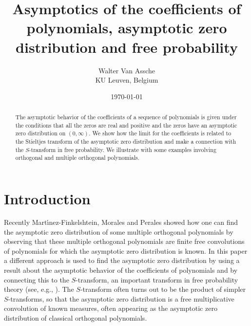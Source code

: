 \documentclass[12pt]{article}
\title{Asymptotics of the coefficients of polynomials,  asymptotic zero distribution and free probability}
\author{Walter Van Assche \\ KU Leuven, Belgium}
\date{\today}
\numberwithin{equation}{section}
\begin{document}
  \maketitle

\begin{abstract}
The asymptotic behavior of the coefficients of a sequence of polynomials is given under the conditions that all the zeros are real and positive and the zeros
have an asymptotic zero distribution on $(0,\infty)$. We show how the limit for the coefficients is related to the Stieltjes transform of the asymptotic zero distribution and make a connection with the  $S$-transform in free probability. We illustrate with some examples involving orthogonal and multiple orthogonal polynomials.
\end{abstract}

\section{Introduction}
Recently Mart\'\i nez-Finkelshtein, Morales and Perales \cite{M-FMP} showed how one can find the asymptotic zero distribution of some multiple orthogonal polynomials
by observing that these multiple orthogonal polynomials are finite free convolutions of polynomials for which the asymptotic zero distribution is known. 
In this paper a different approach is used to find the asymptotic zero distribution by using a result about the asymptotic behavior of the coefficients of polynomials
and by connecting this to the $S$-transform, an important transform in free probability theory (see, e.g., \cite{Speicher}). The $S$-transform often turns out to be the product of simpler $S$-transforms,
so that the asymptotic zero distribution is a free multiplicative convolution of known measures, often appearing as the asymptotic zero distribution of classical orthogonal polynomials.
\end{document}
